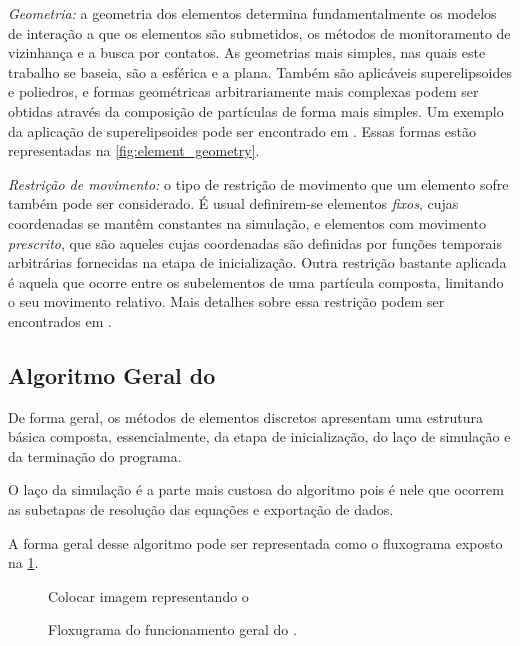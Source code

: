 \begin{alineas}
\item \textit{Geometria:} a geometria dos elementos determina fundamentalmente os modelos de interação a que os elementos são submetidos, os métodos de monitoramento de vizinhança e a busca por contatos. As geometrias mais simples, nas quais este trabalho se baseia, são a esférica e a plana. Também são aplicáveis superelipsoides e poliedros, e formas geométricas arbitrariamente mais complexas podem ser obtidas através da composição de partículas de forma mais simples. Um exemplo da aplicação de superelipsoides pode ser encontrado em . Essas formas estão representadas na \cref{fig:element_geometry}.

\item \textit{Restrição de movimento:} o tipo de restrição de movimento que um elemento sofre também pode ser considerado. É usual definirem-se elementos \textit{fixos}, cujas coordenadas se mantêm constantes na simulação, e elementos com movimento \textit{prescrito}, que são aqueles cujas coordenadas são definidas por funções temporais arbitrárias fornecidas na etapa de inicialização. Outra restrição bastante aplicada é aquela que ocorre entre os subelementos de uma partícula composta, limitando o seu movimento relativo. Mais detalhes sobre essa restrição podem ser encontrados em .
\end{alineas}

\subsection{Algoritmo Geral do \DEM{}} \label{sec:dem_algorithm}

De forma geral, os métodos de elementos discretos apresentam uma estrutura básica composta, essencialmente, da etapa de inicialização, do laço de simulação e da terminação do programa.

O laço da simulação é a parte mais custosa do algoritmo pois é nele que ocorrem as subetapas de resolução das equações e exportação de dados.

A forma geral desse algoritmo pode ser representada como o fluxograma exposto na \cref{fig:general_algorithm}.

\begin{figure}[h]
	\caption{Floxugrama do funcionamento geral do \DEM{}.}
	\centering
		\alert{Colocar imagem representando o \DEM{}}
	\label{fig:general_algorithm}
\end{figure}

